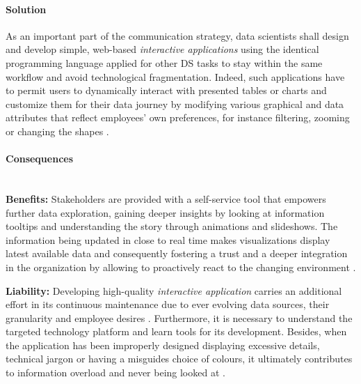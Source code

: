\paragraph*{Solution}
As an important part of the communication strategy, data scientists shall design and develop simple, web-based \emph{interactive applications} using the identical programming language applied for other \ac{DS} tasks to stay within the same workflow and avoid technological fragmentation.
Indeed, such applications have to permit users to dynamically interact with presented tables or charts and customize them for their data journey by modifying various graphical and data attributes that reflect employees' own preferences, for instance filtering, zooming or changing the shapes \parencite{WardInteractiveApps2010}. 

\paragraph*{Consequences} ~\\
{\hspace*{14.5pt} \textbf{Benefits:} \hspace*{-5.5pt} }
Stakeholders are provided with a self-service tool that empowers further data exploration, gaining deeper insights by looking at information tooltips and understanding the story through animations and slideshows. 
The information being updated in close to real time makes visualizations display latest available data and consequently fostering a trust and a deeper integration in the organization by allowing to proactively react to the changing environment \parencites{Domino2017DS}{FieldCadyDSBook}.

\textbf{Liability:}
Developing high-quality \emph{interactive application} carries an additional effort in its continuous maintenance due to ever evolving data sources, their granularity and employee desires \parencites{Clarke2013}{Fern2016}. 
Furthermore, it is necessary to understand the targeted technology platform and learn tools for its development.
Besides, when the application has been improperly designed displaying excessive details, technical jargon or having a misguides choice of colours, it ultimately contributes to information overload and never being looked at \parencites{InformaVisualiz}{Gershon1998}{Carr1999}{TabPatriVisual2015}. 

